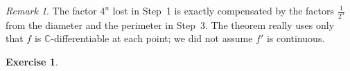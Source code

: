 \documentclass[11pt]{article}
\theoremstyle{plain}
\theoremstyle{definition}
\newtheorem{definition}[theorem]{Definition}
\newtheorem{example}[theorem]{Example}
\newtheorem{exercise}[theorem]{Exercise}
\theoremstyle{remark}
\newtheorem*{remark}{Remark}
\numberwithin{equation}{section}
\newcommand{\be}{\begin{eqnarray}}
\newcommand{\ee}{\end{eqnarray}}
\newcommand{\C}{\mathbb{C}}
\begin{document}
\begin{remark}
The factor $4^n$ lost in Step~1 is exactly compensated by the factors
$\frac1{2^n}$ from the diameter and the perimeter in Step~3. The theorem
really uses only that $f$ is $\C$-differentiable at each point; we did not
assume $f'$ is continuous.
\end{remark}

\begin{exercise}
	
	
\end{exercise}
%
%
\end{document}
